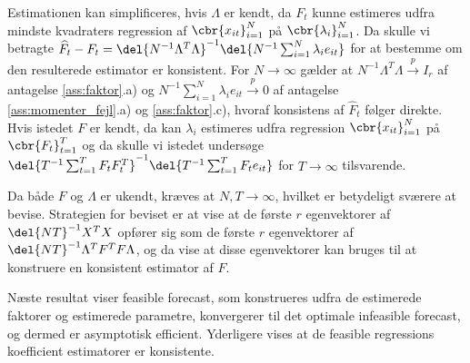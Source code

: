 Estimationen kan simplificeres, hvis \(\Lambda\) er kendt, da \(F_t\)  kunne estimeres udfra mindste kvadraters regression af \(\cbr{x_{it}}_{i=1}^N\) på \(\cbr{\lambda_i}_{i=1}^N\).
Da skulle vi betragte \(\widehat{F}_t - F_t = \del{N^{-1} \Lambda^T \Lambda}^{-1} \del{N^{-1} \sum_{i=1}^N \lambda_i e_{it}}\) for at bestemme om den resulterede estimator er konsistent.
For \(N \rightarrow \infty\) gælder at \(N^{-1} \Lambda^T \Lambda \overset{p}{\rightarrow} I_r\) af antagelse \ref{ass:faktor}.a) og \(N^{-1} \sum_{i=1}^N \lambda_i e_{it} \overset{p}{\rightarrow} 0\) af antagelse \ref{ass:momenter_fejl}.a) og \ref{ass:faktor}.c), hvoraf konsistens af \(\widehat{F}_t\) følger direkte.
Hvis istedet \(F\) er kendt, da kan \(\lambda_i\) estimeres udfra regression \(\cbr{x_{it}}_{i=1}^N\) på \(\cbr{F_{t}}_{t=1}^T\) og da skulle vi istedet undersøge \(\del{T^{-1} \sum_{t=1}^T F_t F_t^T}^{-1} \del{T^{-1} \sum_{t=1}^T F_t e_{it}}\) for \(T \rightarrow \infty\) tilsvarende.

Da både \(F\) og \(\Lambda\) er ukendt, kræves at \(N, T \rightarrow \infty\), hvilket er betydeligt sværere at bevise.
Strategien for beviset er at vise at de første \(r\) egenvektorer af \(\del{NT}^{-1} X^T X\) opfører sig som de første \(r\) egenvektorer af \(\del{NT}^{-1} \Lambda^T F^T F \Lambda\), og da vise at disse egenvektorer kan bruges til at konstruere en konsistent estimator af \(F\).

Næste resultat viser feasible forecast, som konstrueres udfra de estimerede faktorer og estimerede parametre, konvergerer til det optimale infeasible forecast, og dermed er asymptotisk efficient.
Yderligere vises at de feasible regressions koefficient estimatorer er konsistente.

